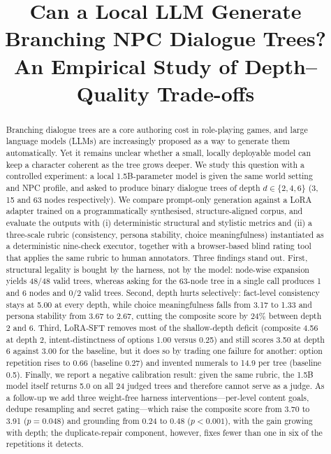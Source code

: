 \documentclass[conference]{IEEEtran}
\begin{document}
\title{Can a Local LLM Generate Branching NPC Dialogue Trees?\\
An Empirical Study of Depth--Quality Trade-offs}

\author{
}

\maketitle

\begin{abstract}
Branching dialogue trees are a core authoring cost in role-playing games, and large language
models (LLMs) are increasingly proposed as a way to generate them automatically. Yet it remains
unclear whether a small, locally deployable model can keep a character coherent as the tree grows
deeper. We study this question with a controlled experiment: a local 1.5B-parameter model is given
the same world setting and NPC profile, and asked to produce binary dialogue trees of depth
$d\in\{2,4,6\}$ (3, 15 and 63 nodes respectively). We compare prompt-only generation against a
LoRA adapter trained on a programmatically synthesised, structure-aligned corpus, and evaluate the
outputs with (i) deterministic structural and stylistic metrics and (ii) a three-scale rubric
(consistency, persona stability, choice meaningfulness) instantiated as a deterministic
nine-check executor, together with a browser-based blind rating tool that applies the same rubric
to human annotators. Three findings stand out. First, structural legality is bought by the
harness, not by the model: node-wise expansion yields 48/48 valid trees, whereas asking for the
63-node tree in a single call produces 1 and 6 nodes and 0/2 valid trees. Second, depth hurts
selectively: fact-level consistency stays at 5.00 at every depth, while choice meaningfulness
falls from 3.17 to 1.33 and persona stability from 3.67 to 2.67, cutting the composite score by
24\% between depth 2 and 6. Third, LoRA-SFT removes most of the shallow-depth deficit (composite
4.56 at depth 2, intent-distinctness of options 1.00 versus 0.25) and still scores 3.50 at depth 6
against 3.00 for the baseline, but it does so by trading one failure for another: option repetition
rises to 0.66 (baseline 0.27) and invented numerals to 14.9 per tree (baseline 0.5). Finally, we
report a negative calibration result: given the same rubric, the 1.5B model itself returns 5.0 on
all 24 judged trees and therefore cannot serve as a judge. As a follow-up we add three weight-free
harness interventions---per-level content goals, dedupe resampling and secret gating---which raise
the composite score from 3.70 to 3.91 ($p=0.048$) and grounding from 0.24 to 0.48 ($p<0.001$), with
the gain growing with depth; the duplicate-repair component, however, fixes fewer than one in six of
the repetitions it detects.
\end{abstract}
\end{document}
